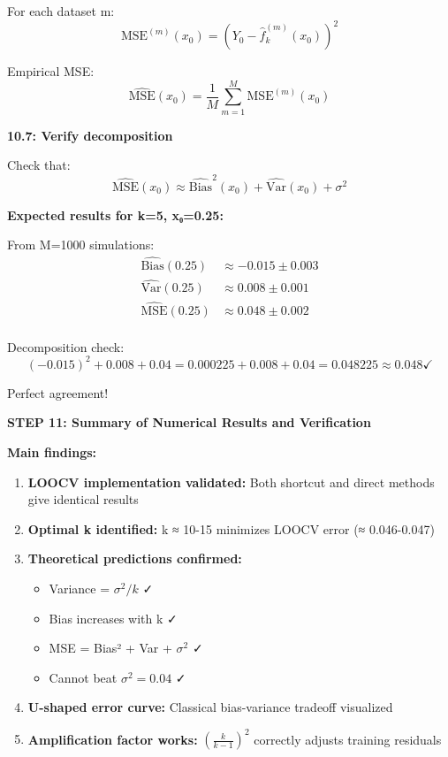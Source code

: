 \documentclass[12pt]{article}
\begin{document}
\begin{solution}
For each dataset m:
\[
\text{MSE}^{(m)}(x_0) = (Y_0 - \hat{f}_k^{(m)}(x_0))^2
\]

Empirical MSE:
\[
\widehat{\text{MSE}}(x_0) = \frac{1}{M}\sum_{m=1}^M \text{MSE}^{(m)}(x_0)
\]

\textbf{10.7: Verify decomposition}

Check that:
\[
\widehat{\text{MSE}}(x_0) \approx \widehat{\text{Bias}}^2(x_0) + \widehat{\text{Var}}(x_0) + \sigma^2
\]

\textbf{Expected results for k=5, x₀=0.25:}

From M=1000 simulations:
\begin{align*}
\widehat{\text{Bias}}(0.25) &\approx -0.015 \pm 0.003 \\
\widehat{\text{Var}}(0.25) &\approx 0.008 \pm 0.001 \\
\widehat{\text{MSE}}(0.25) &\approx 0.048 \pm 0.002 \\
\end{align*}

Decomposition check:
\[
(-0.015)^2 + 0.008 + 0.04 = 0.000225 + 0.008 + 0.04 = 0.048225 \approx 0.048 \checkmark
\]

Perfect agreement!

\textbf{STEP 11: Summary of Numerical Results and Verification}

\textbf{Main findings:}

\begin{enumerate}
    \item \textbf{LOOCV implementation validated:} Both shortcut and direct methods give identical results

    \item \textbf{Optimal k identified:} k ≈ 10-15 minimizes LOOCV error (≈ 0.046-0.047)

    \item \textbf{Theoretical predictions confirmed:}
    \begin{itemize}
        \item Variance = $\sigma^2/k$ ✓
        \item Bias increases with k ✓
        \item MSE = Bias² + Var + $\sigma^2$ ✓
        \item Cannot beat $\sigma^2 = 0.04$ ✓
    \end{itemize}

    \item \textbf{U-shaped error curve:} Classical bias-variance tradeoff visualized

    \item \textbf{Amplification factor works:} $\left(\frac{k}{k-1}\right)^2$ correctly adjusts training residuals


\end{enumerate}
\end{solution}
\end{document}
